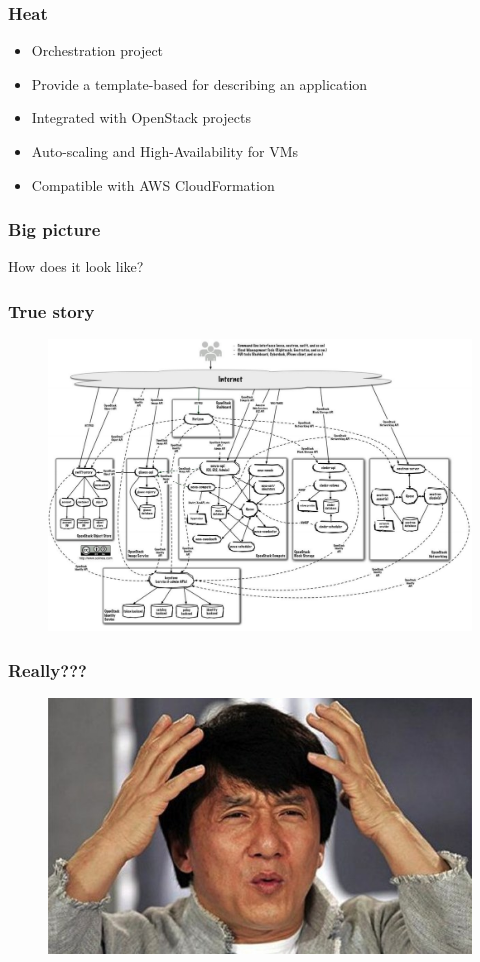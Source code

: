 \begin{frame}
	\frametitle{Heat}
	\begin{itemize}
		\item Orchestration project
		\item Provide a template-based for describing an
              application
		\item Integrated with OpenStack projects
		\item Auto-scaling and High-Availability for VMs
		\item Compatible with AWS CloudFormation
	\end{itemize}
\end{frame}

\begin{frame}
	\frametitle{Big picture}
\Huge How does it look like?
\end{frame}

\begin{frame}
	\frametitle{True story}
	\begin{figure}
		\includegraphics[width=0.8\linewidth]{images/spagetti.png}
	\end{figure}
\end{frame}

\begin{frame}
	\frametitle{Really???}
	\begin{figure}
		\includegraphics[width=0.8\linewidth]{images/jc.jpg}
	\end{figure}
\end{frame}

